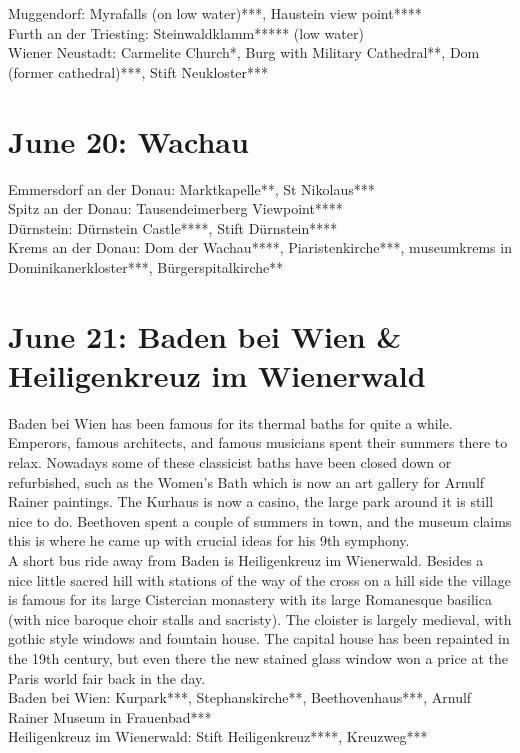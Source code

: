{Muggendorf: Myrafalls (on low water)***, Haustein view point****\\
Furth an der Triesting: Steinwaldklamm***** (low water)\\
Wiener Neustadt: Carmelite Church*, Burg with Military Cathedral**, Dom (former cathedral)***, Stift Neukloster***

\section{June 20: Wachau}
\label{2021JuneWachau}

Emmersdorf an der Donau: Marktkapelle**, St Nikolaus***\\
Spitz an der Donau: Tausendeimerberg Viewpoint****\\
D\"urnstein: D\"urnstein Castle****, Stift D\"urnstein****\\
Krems an der Donau: Dom der Wachau****, Piaristenkirche***, museumkrems in Dominikanerkloster***, B\"urgerspitalkirche**

\section{June 21: Baden bei Wien \& Heiligenkreuz im Wienerwald}
\label{2021Heiligenkreuz}

Baden bei Wien has been famous for its thermal baths for quite a while. Emperors, famous architects, and famous musicians spent their summers there to relax. Nowadays some of these classicist baths have been closed down or refurbished, such as the Women's Bath which is now an art gallery for Arnulf Rainer paintings. The Kurhaus is now a casino, the large park around it is still nice to do. Beethoven spent a couple of summers in town, and the museum claims this is where he came up with crucial ideas for his 9th symphony.\\

A short bus ride away from Baden is Heiligenkreuz im Wienerwald. Besides a nice little sacred hill with stations of the way of the cross on a hill side the village is famous for its large Cistercian monastery with its large Romanesque basilica (with nice baroque choir stalls and sacristy). The cloister is largely medieval, with gothic style windows and fountain house. The capital house has been repainted in the 19th century, but even there the new stained glass window won a price at the Paris world fair back in the day.\\ 

Baden bei Wien: Kurpark***, Stephanskirche**, Beethovenhaus***, Arnulf Rainer Museum in Frauenbad***\\
Heiligenkreuz im Wienerwald: Stift Heiligenkreuz****, Kreuzweg***

}
